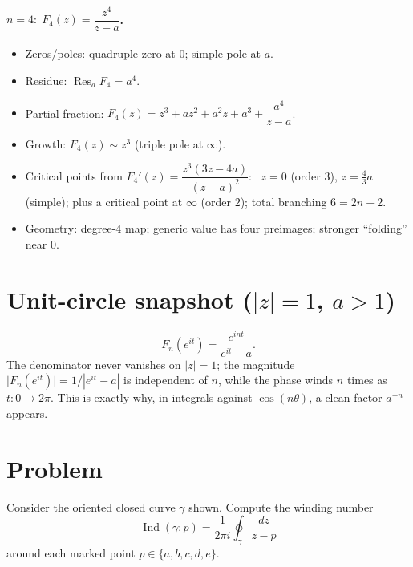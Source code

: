 \documentclass[11pt]{article}
\DeclareMathOperator{\Res}{Res}
\DeclareMathOperator{\Ind}{Ind}
\begin{document}
\paragraph{$n=4:\; F_4(z)=\dfrac{z^{4}}{z-a}$.}
\begin{itemize}
	\item Zeros/poles: quadruple zero at $0$; simple pole at $a$.
	\item Residue: $\Res_{a}F_4=a^{4}$.
	\item Partial fraction: $F_4(z)=z^{3}+az^{2}+a^{2}z+a^{3}+\dfrac{a^{4}}{z-a}$.
	\item Growth: $F_4(z)\sim z^{3}$ (triple pole at $\infty$).
	\item Critical points from $F_4'(z)=\dfrac{z^{3}(3z-4a)}{(z-a)^2}$:
	\ $z=0$ (order $3$), $z=\tfrac{4}{3}a$ (simple); plus a critical point at $\infty$ (order $2$);
	total branching $6=2n-2$.
	\item Geometry: degree-$4$ map; generic value has four preimages; stronger ``folding'' near $0$.
\end{itemize}

\section*{Unit-circle snapshot ($|z|=1$, $a>1$)}
\[
F_n(e^{it})=\frac{e^{int}}{e^{it}-a}.
\]
The denominator never vanishes on $|z|=1$; the magnitude
$\big|F_n(e^{it})\big|=1/|e^{it}-a|$ is independent of $n$, while the phase winds $n$ times as $t:0\to2\pi$.
This is exactly why, in integrals against $\cos(n\theta)$, a clean factor $a^{-n}$ appears.

\section*{Problem}
Consider the oriented closed curve $\gamma$ shown. Compute the winding number
\[
\Ind(\gamma;p)=\frac{1}{2\pi i}\oint_{\gamma}\frac{dz}{z-p}
\]
around each marked point $p\in\{a,b,c,d,e\}$.
\end{document}
